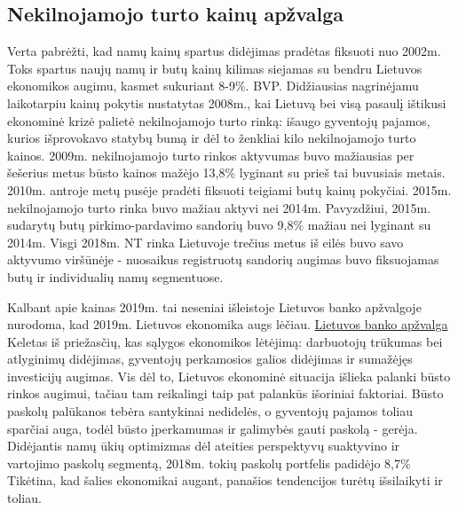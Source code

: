 \documentclass[11pt, titlepage]{article}
\begin{document}
\subsection{Nekilnojamojo turto kainų apžvalga}
Verta pabrėžti, kad namų kainų spartus didėjimas pradėtas fiksuoti nuo 2002m. Toks spartus naujų namų ir butų kainų kilimas siejamas su bendru Lietuvos ekonomikos augimu, kasmet sukuriant 8-9\%. BVP. Didžiausias nagrinėjamu laikotarpiu kainų pokytis nustatytas 2008m., kai Lietuvą bei visą pasaulį ištikusi ekonominė krizė palietė nekilnojamojo turto rinką: išaugo gyventojų pajamos, kurios išprovokavo statybų bumą ir dėl to ženkliai kilo nekilnojamojo turto kainos. 2009m. nekilnojamojo turto rinkos aktyvumas buvo mažiausias per šešerius metus būsto kainos mažėjo 13,8\% lyginant su prieš tai buvusiais metais. 2010m. antroje metų pusėje pradėti fiksuoti teigiami butų kainų pokyčiai. 2015m. nekilnojamojo turto rinka buvo mažiau aktyvi nei 2014m. Pavyzdžiui, 2015m. sudarytų butų pirkimo-pardavimo sandorių buvo 9,8\% mažiau nei lyginant su 2014m. Visgi 2018m. NT rinka Lietuvoje trečius metus iš eilės buvo savo aktyvumo viršūnėje - nuosaikus registruotų sandorių augimas buvo fiksuojamas butų ir individualių namų segmentuose. 
\par
Kalbant apie kainas 2019m. tai neseniai išleistoje Lietuvos banko apžvalgoje nurodoma, kad 2019m. Lietuvos ekonomika augs lėčiau. \href{https://www.lb.lt/uploads/publications/docs/21756_d778713ca234ccc09dc70e7312b44d89.pdf}{Lietuvos banko apžvalga}
Keletas iš priežasčių, kas sąlygos ekonomikos lėtėjimą: darbuotojų trūkumas bei atlyginimų didėjimas, gyventojų perkamosios galios didėjimas ir sumažėjęs investicijų augimas. Vis dėl to, Lietuvos ekonominė situacija išlieka palanki būsto rinkos augimui, tačiau tam reikalingi taip pat palankūs išoriniai faktoriai. Būsto paskolų palūkanos tebėra santykinai nedidelės, o gyventojų pajamos toliau sparčiai auga, todėl būsto įperkamumas ir galimybės gauti paskolą - gerėja. Didėjantis namų ūkių optimizmas dėl ateities perspektyvų suaktyvino ir vartojimo paskolų segmentą, 2018m. tokių paskolų portfelis padidėjo 8,7\% Tikėtina, kad šalies ekonomikai augant, panašios tendencijos turėtų išsilaikyti ir toliau. 
\end{document}
